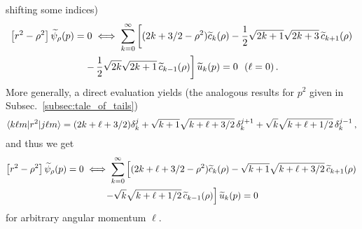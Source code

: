  shifting some indices)
  \begin{multline}
   \left[r^2-\rho^2\right]\widetilde{\psi}_\rho(p) = 0
   \iff \sum_{k=0}^\infty\left[(2k+3/2-\rho^2)\widetilde{c}_k(\rho)
   - \frac12\sqrt{2k+1}\sqrt{2k+3}\,\widetilde{c}_{k+1}(\rho)\right. \\
   \left.-\,\frac12\sqrt{2k}\sqrt{2k+1}\,\widetilde{c}_{k-1}(\rho)\right]\widetilde{u}_k(p)
   = 0 \ \  (\ell = 0) \,.
  \label{eq:r2rho2-psi-exp}
  \end{multline}
  More generally, a direct evaluation yields (\cf the analogous results
  for $p^2$ given in Subsec.~\ref{subsec:tale_of_tails})
  \begin{equation}
   \langle k\ell m|r^2|j\ell m\rangle = (2k+\ell+3/2)\delta_k^j
   + \sqrt{k+1}\sqrt{k+\ell+3/2}\,\delta_k^{j+1}
   + \sqrt{k}\sqrt{k+\ell+1/2}\,\delta_k^{j-1} \,,
  \label{eq:r2-gen}
  \end{equation}
  and thus we get
  \begin{multline}
   \left[r^2-\rho^2\right]\widetilde{\psi}_\rho(p) = 0
   \iff \sum_{k=0}^\infty\left[(2k+\ell+3/2-\rho^2)\widetilde{c}_k(\rho)
   - \sqrt{k+1}\sqrt{k+\ell+3/2}\,\widetilde{c}_{k+1}(\rho)\right. \\
   \left.-\sqrt{k}\sqrt{k+\ell+1/2}\,\widetilde{c}_{k-1}(\rho)\right]
   \widetilde{u}_k(p) = 0
  \label{eq:r2rho2-psi-exp-ell}
  \end{multline}
  for arbitrary angular momentum $\ell$.

